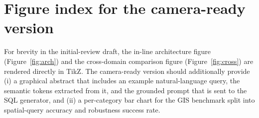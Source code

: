 \documentclass[11pt]{article}
\begin{document}
\section{Figure index for the camera-ready version}
\label{sec:figures}
For brevity in the initial-review draft, the in-line architecture figure (Figure~\ref{fig:arch}) and the cross-domain comparison figure (Figure~\ref{fig:cross}) are rendered directly in TikZ. The camera-ready version should additionally provide (i) a graphical abstract that includes an example natural-language query, the semantic tokens extracted from it, and the grounded prompt that is sent to the SQL generator, and (ii) a per-category bar chart for the GIS benchmark split into spatial-query accuracy and robustness success rate.
\end{document}
